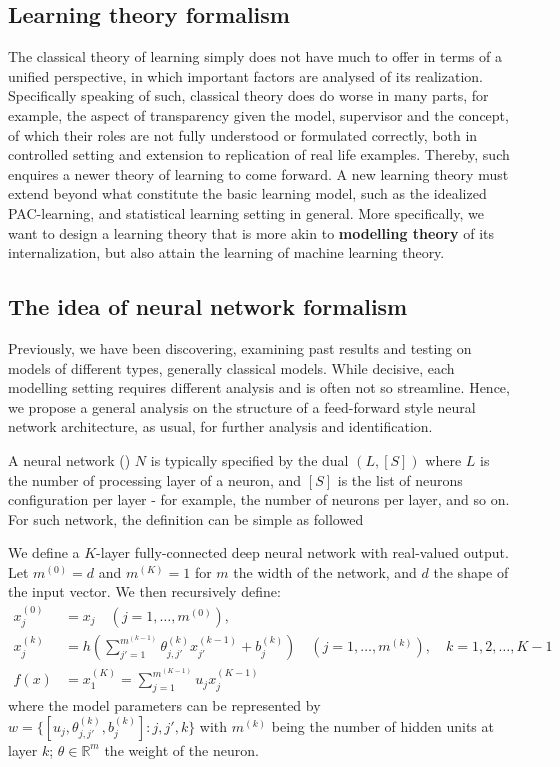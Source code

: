 \documentclass[10pt]{article} %
\begin{document}
\subsection{Learning theory formalism}

The classical theory of learning simply does not have much to offer in terms of a unified perspective, in which important factors are analysed of its realization. Specifically speaking of such, classical theory does do worse in many parts, for example, the aspect of transparency given the model, supervisor and the concept, of which their roles are not fully understood or formulated correctly, both in controlled setting and extension to replication of real life examples. Thereby, such enquires a newer theory of learning to come forward. A new learning theory must extend beyond what constitute the basic learning model, such as the idealized PAC-learning, and statistical learning setting in general. More specifically, we want to design a learning theory that is more akin to \textbf{modelling theory} of its internalization, but also attain the learning of machine learning theory. 

\subsection{The idea of neural network formalism}
Previously, we have been discovering, examining past results and testing on models of different types, generally classical models. While decisive, each modelling setting requires different analysis and is often not so streamline. Hence, we propose a general analysis on the structure of a feed-forward style neural network architecture, as usual, for further analysis and identification. 

A neural network (\cite{goodfellow2016deep,zhang2023mathematical}) $N$ is typically specified by the dual $(L,[S])$ where $L$ is the number of processing layer of a neuron, and $[S]$ is the list of neurons configuration per layer - for example, the number of neurons per layer, and so on. For such network, the definition can be simple as followed 

\begin{definition}
    We define a $K$-layer fully-connected deep neural network with real-valued output. Let $m^{(0)}=d$ and $m^{(K)}=1$ for $m$ the width of the network, and $d$ the shape of the input vector. We then recursively define: 
\begin{align}
    x_{j}^{(0)} &= x_{j} \quad (j=1,\dots,m^{(0)}),\\ 
    x_{j}^{(k)} &= h\left(\sum^{m^{(k-1)}}_{j'=1} \theta_{j,j'}^{(k)}x_{j'}^{(k-1)}+ b_{j}^{(k)}\right)\quad (j=1,\dots,m^{(k)}), \quad k = 1,2,\dots,K-1\\
    f(x) & = x_{1}^{(K)} = \sum^{m^{(K-1)}}_{j=1} u_{j}x_{j}^{(K-1)}
\end{align}
where the model parameters can be represented by $w=\{[u_{j}, \theta_{j,j'}^{(k)}, b_{j}^{(k)}]: j,j',k\}$ with $m^{(k)}$ being the number of hidden units at layer $k$; $\theta\in \mathbb{R}^{m}$ the weight of the neuron.
\end{definition}
\end{document}
